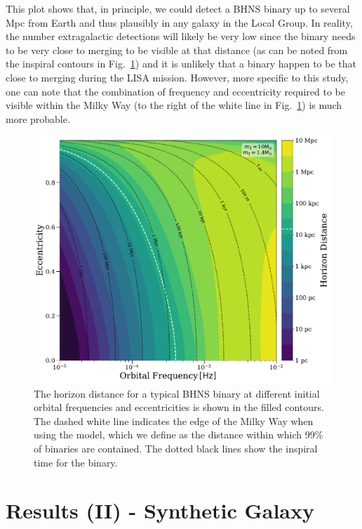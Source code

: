 \documentclass[twocolumn]{aastex63}
\begin{document}
This plot shows that, in principle, we could detect a BHNS binary up to several Mpc from Earth and thus plausibly in any galaxy in the Local Group. In reality, the number extragalactic detections will likely be very low since the binary needs to be very close to merging to be visible at that distance (as can be noted from the inspiral contours in Fig.~\ref{fig:bhns_horizon_distance}) and it is unlikely that a binary happen to be that close to merging during the LISA mission. However, more specific to this study, one can note that the combination of frequency and eccentricity required to be visible within the Milky Way (to the right of the white line in Fig.~\ref{fig:bhns_horizon_distance}) is much more probable.

\begin{figure}[htb]
    \centering
    \includegraphics[width=\columnwidth]{horizon_distance.pdf}
    \caption{The horizon distance for a typical BHNS binary at different initial orbital frequencies and eccentricities is shown in the filled contours. The dashed white line indicates the edge of the Milky Way when using the \cite{Frankel+2018} model, which we define as the distance within which 99\% of binaries are contained. The dotted black lines show the inspiral time for the binary.}
    \label{fig:bhns_horizon_distance}
\end{figure}

\section{Results (II) - Synthetic Galaxy} \label{sec:resultsII}
\end{document}
